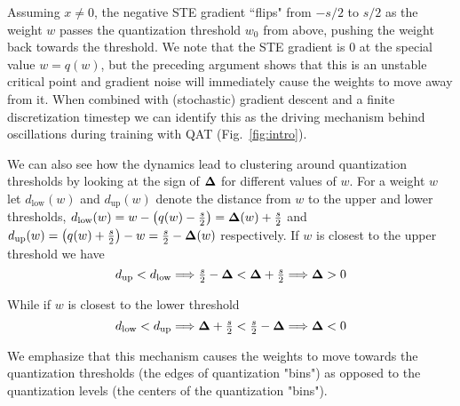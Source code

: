 Assuming $x \neq 0$, the negative STE gradient ``flips" from $-s/2$ to $s/2$ as the weight $w$ passes the quantization threshold $w_0$ from above, pushing the weight back towards the threshold. We note that the STE gradient is $0$ at the special value $w = q(w)$, but the preceding argument shows that this is an unstable critical point and gradient noise will immediately cause the weights to move away from it. When combined with (stochastic) gradient descent and a finite discretization timestep we can identify this as the driving mechanism behind oscillations during training with QAT (Fig.~\ref{fig:intro}). 

We can also see how the dynamics lead to clustering around quantization thresholds by looking at the sign of $\mathbf{\Delta}$ for different values of $w$. For a weight $w$ let $d_{\text{low}}(w)$ and $d_{\text{up}}(w)$ denote the distance from $w$ to the upper and lower thresholds,
$d_{\text{low}}(w) = w - \bigl(q(w) - \frac{s}{2}\bigr) = \mathbf{\Delta}(w) + \tfrac{s}{2}$ and 
$d_{\text{up}}(w) = \bigl(q(w) + \frac{s}{2}\bigr) - w = \tfrac{s}{2} - \mathbf{\Delta}(w)$ respectively.
If $w$ is closest to the upper threshold we have 
\begin{equation}
d_{\text{up}} < d_{\text{low}}
\Longrightarrow
\tfrac{s}{2} - \mathbf{\Delta} < \mathbf{\Delta} + \tfrac{s}{2}
\Longrightarrow
\mathbf{\Delta} > 0
\end{equation}

While if $w$ is closest to the lower threshold
\begin{equation}
d_{\text{low}} < d_{\text{up}}
\Longrightarrow
\mathbf{\Delta} + \tfrac{s}{2} < \tfrac{s}{2} - \mathbf{\Delta}
\Longrightarrow
\mathbf{\Delta} < 0
\end{equation}

We emphasize that this mechanism causes the weights to move towards the quantization thresholds (the edges of quantization "bins") as opposed to the quantization levels (the centers of the quantization "bins").





